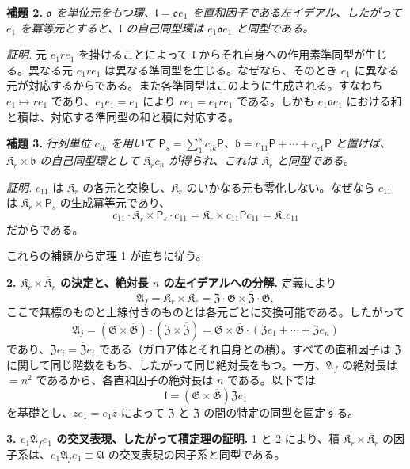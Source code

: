 \noindent\textbf{補題 2.} \emph{\(\mathfrak o\) を単位元をもつ環、\(\mathfrak l=\mathfrak o e_1\) を直和因子である左イデアル、したがって \(e_1\) を冪等元とすると、\(\mathfrak l\) の自己同型環は \(e_1\mathfrak o e_1\) と同型である。}

\noindent\emph{証明.} 元 \(e_1re_1\) を掛けることによって \(\mathfrak l\) からそれ自身への作用素準同型が生じる。異なる元 \(e_1re_1\) は異なる準同型を生じる。なぜなら、そのとき \(e_1\) に異なる元が対応するからである。また各準同型はこのように生成される。すなわち \(e_1\mapsto re_1\) であり、\(e_1e_1=e_1\) により \(re_1=e_1re_1\) である。しかも \(e_1\mathfrak o e_1\) における和と積は、対応する準同型の和と積に対応する。

\noindent\textbf{補題 3.} \emph{行列単位 \(c_{ik}\) を用いて \(\mathsf P_s=\sum_1^s c_{ik}\mathsf P\)、\(\mathfrak b=c_{11}\mathsf P+\cdots+c_{s1}\mathsf P\) と置けば、\(\mathfrak K_r\times\mathfrak b\) の自己同型環として \(\mathfrak K_rc_n\) が得られ、これは \(\mathfrak K_r\) と同型である。}

\noindent\emph{証明.} \(c_{11}\) は \(\mathfrak K_r\) の各元と交換し、\(\mathfrak K_r\) のいかなる元も零化しない。なぜなら \(c_{11}\) は \(\mathfrak K_r\times\mathsf P_s\) の生成冪等元であり、
\[
c_{11}\cdot\mathfrak K_r\times\mathsf P_s\cdot c_{11}
=\mathfrak K_r\times c_{11}\mathsf Pc_{11}
=\mathfrak K_rc_{11}
\]
だからである。

これらの補題から定理 1 が直ちに従う。

\noindent\textbf{2. \(\mathfrak K_r\times\overline{\mathfrak K}_r\) の決定と、絶対長 \(n\) の左イデアルへの分解.} 定義により
\[
\mathfrak A_f=\mathfrak K_r\times\overline{\mathfrak K}_r
=\mathfrak Z\cdot\mathfrak G\times\overline{\mathfrak Z}\cdot\overline{\mathfrak G},
\]
ここで無標のものと上線付きのものとは各元ごとに交換可能である。したがって
\[
\mathfrak A_j
=(\mathfrak G\times\overline{\mathfrak G})\cdot
(\mathfrak Z\times\overline{\mathfrak Z})
=\mathfrak G\times\overline{\mathfrak G}\cdot
(\mathfrak Ze_1+\cdots+\mathfrak Ze_n)
\]
であり、\(\mathfrak Ze_i=\overline{\mathfrak Z}e_i\) である（ガロア体とそれ自身との積）。すべての直和因子は \(\mathfrak Z\) に関して同じ階数をもち、したがって同じ絶対長をもつ。一方、\(\mathfrak A_f\) の絶対長は \(=n^2\) であるから、各直和因子の絶対長は \(n\) である。以下では
\[
\mathfrak l=(\mathfrak G\times\overline{\mathfrak G})\mathfrak Ze_1
\]
を基礎とし、\(ze_1=e_1\bar z\) によって \(\mathfrak Z\) と \(\overline{\mathfrak Z}\) の間の特定の同型を固定する。

\noindent\textbf{3. \(e_1\mathfrak A_fe_1\) の交叉表現、したがって積定理の証明.} 1 と 2 により、積 \(\mathfrak K_r\times\overline{\mathfrak K}_r\) の因子系は、\(e_1\mathfrak A_je_1\equiv\mathfrak A\) の交叉表現の因子系と同型である。

